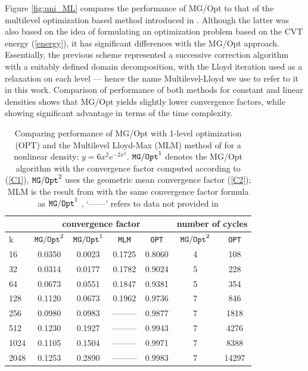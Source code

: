\documentclass{siamltex}
\begin{document}

Figure \ref{fig:uni_ML}  compares the performance of MG/Opt to that of the multilevel optimization based method introduced in \cite{DE08}. Although the latter was also based on the idea of formulating an optimization problem based on the CVT energy (\ref{energy}), it has significant differences with the MG/Opt approach. Essentially, the previous scheme represented a successive correction algorithm with a suitably defined domain decomposition, with the Lloyd iteration used as a relaxation on each level --- hence %
the name Multilevel-Lloyd we use to refer to it in this work. Comparison of performance of both methods for constant and linear densities shows that MG/Opt yields slightly lower convergence factors, while showing significant advantage in terms of the time complexity.




\begin{table}
\begin{center}
\begin{tabular}{| l |c | c | c | c | c |c |} \hline
 &\multicolumn{4}{|c|}{convergence factor} &\multicolumn{2}{|c|}{number of cycles }\\ \hline
k& ${\tt MG/Opt}^{2}$&${\tt MG/Opt}^{1}$&{\tt MLM}\cite{yavneh03}&{\tt OPT}&${\tt MG/Opt}^{2}$&{\tt OPT}\\ \hline
16&0.0350&0.0023&0.1725&0.8060&4&108\\ \hline
32&0.0314&0.0177&0.1782&0.9024&5&228 \\ \hline
64&0.0673&0.0551&0.1847&0.9381&5&354 \\ \hline
128&0.1120&0.0673&0.1962&0.9736&7&846 \\ \hline
256&0.0980& 0.0983 &    ---------    &0.9877&7&1818\\ \hline
512&0.1230&  0.1927         &---------   &0.9943&7&4276 \\ \hline
1024&0.1105&0.1504          & --------- &0.9971&7&8388\\ \hline
2048&0.1253&   0.2890          & ---------   &0.9983&7&14297 \\ \hline
 \end{tabular}
\end{center}
\caption{Comparing performance of MG/Opt with 1-level optimization (OPT) and the Multilevel Lloyd-Max %
(MLM) method of \cite{yavneh03} for a nonlinear density: $y=6x^{2}e^{-2x^{3}}$. %
${\tt MG/Opt}^{1}$ denotes the MG/Opt algorithm with the convergence factor computed according to %
(\ref{C1}), ${\tt MG/Opt}^{2}$ uses the geometric mean convergence factor (\ref{C2}); MLM\cite{yavneh03} is the result from \cite{yavneh03} with the same convergence factor formula as ${\tt MG/Opt}^{1}$ , 
`------' refers to data not provided in \cite{yavneh03}} %
\label{mytable}
\end{table}
\end{document}
